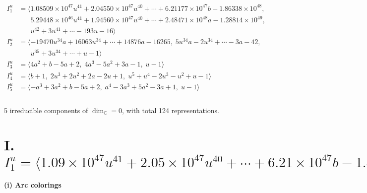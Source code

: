 \documentclass[1p]{elsarticle_modified}
\theoremstyle{definition}
\begin{document}
\begin{align*}
I^u_{1}&=\langle 
1.08509\times10^{47} u^{41}+2.04550\times10^{47} u^{40}+\cdots+6.21177\times10^{47} b-1.86338\times10^{48},\\
\phantom{I^u_{1}}&\phantom{= \langle  }5.29448\times10^{46} u^{41}+1.94560\times10^{47} u^{40}+\cdots+2.48471\times10^{48} a-1.28814\times10^{49},\\
\phantom{I^u_{1}}&\phantom{= \langle  }u^{42}+3 u^{41}+\cdots-193 u-16\rangle \\
I^u_{2}&=\langle 
-19470 u^{34} a+16063 u^{34}+\cdots+14876 a-16265,\;5 u^{34} a-2 u^{34}+\cdots-3 a-42,\\
\phantom{I^u_{2}}&\phantom{= \langle  }u^{35}+3 u^{34}+\cdots+u-1\rangle \\
I^u_{3}&=\langle 
4 a^2+b-5 a+2,\;4 a^3-5 a^2+3 a-1,\;u-1\rangle \\
I^u_{4}&=\langle 
b+1,\;2 u^3+2 u^2+2 a-2 u+1,\;u^5+u^4-2 u^3- u^2+u-1\rangle \\
I^u_{5}&=\langle 
- a^3+3 a^2+b-5 a+2,\;a^4-3 a^3+5 a^2-3 a+1,\;u-1\rangle \\
\\
\end{align*}
\raggedright * 5 irreducible components of $\dim_{\mathbb{C}}=0$, with total 124 representations.\\
\newpage
\renewcommand{\arraystretch}{1}
\centering \section*{I. $I^u_{1}= \langle 1.09\times10^{47} u^{41}+2.05\times10^{47} u^{40}+\cdots+6.21\times10^{47} b-1.86\times10^{48},\;5.29\times10^{46} u^{41}+1.95\times10^{47} u^{40}+\cdots+2.48\times10^{48} a-1.29\times10^{49},\;u^{42}+3 u^{41}+\cdots-193 u-16 \rangle$}
\flushleft \textbf{(i) Arc colorings}\\
\end{document}
